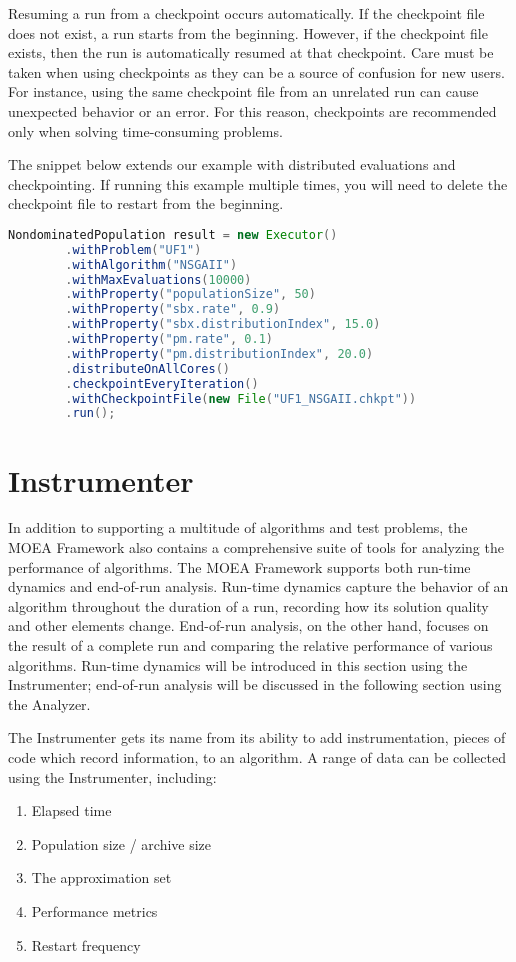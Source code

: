 Resuming a run from a checkpoint occurs automatically.  If the checkpoint file does not exist, a run starts from the beginning.  However, if the checkpoint file exists, then the run is automatically resumed at that checkpoint.  Care must be taken when using checkpoints as they can be a source of confusion for new users.  For instance, using the same checkpoint file from an unrelated run can cause unexpected behavior or an error.  For this reason, checkpoints are recommended only when solving time-consuming problems.

The snippet below extends our example with distributed evaluations and checkpointing.  If running this example multiple times, you will need to delete the checkpoint file to restart from the beginning.

\begin{lstlisting}[language=Java]
NondominatedPopulation result = new Executor()
		.withProblem("UF1")
		.withAlgorithm("NSGAII")
		.withMaxEvaluations(10000)
		.withProperty("populationSize", 50)
		.withProperty("sbx.rate", 0.9)
		.withProperty("sbx.distributionIndex", 15.0)
		.withProperty("pm.rate", 0.1)
		.withProperty("pm.distributionIndex", 20.0)
		.distributeOnAllCores()
		.checkpointEveryIteration()
		.withCheckpointFile(new File("UF1_NSGAII.chkpt"))
		.run();
\end{lstlisting}

\section{Instrumenter}
In addition to supporting a multitude of algorithms and test problems, the MOEA Framework also contains a comprehensive suite of tools for analyzing the performance of algorithms.  The MOEA Framework supports both run-time dynamics and end-of-run analysis.  Run-time dynamics capture the behavior of an algorithm throughout the duration of a run, recording how its solution quality and other elements change.  End-of-run analysis, on the other hand, focuses on the result of a complete run and comparing the relative performance of various algorithms.  Run-time dynamics will be introduced in this section using the Instrumenter; end-of-run analysis will be discussed in the following section using the Analyzer.

The Instrumenter gets its name from its ability to add instrumentation, pieces of code which record information, to an algorithm.  A range of data can be collected using the Instrumenter, including:

\begin{enumerate}
  \item Elapsed time
  \item Population size / archive size
  \item The approximation set
  \item Performance metrics
  \item Restart frequency
\end{enumerate}

